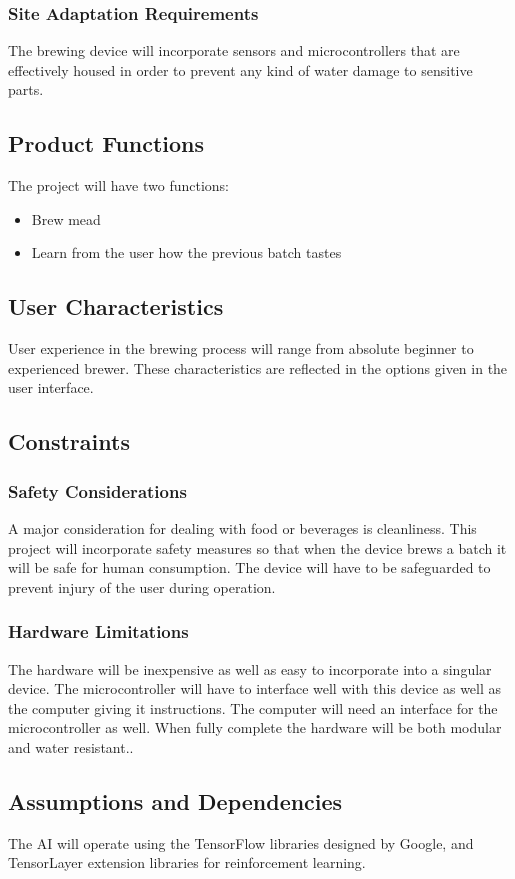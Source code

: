 \documentclass[draftclsnofoot,onecolumn,letterpaper,10pt]{IEEEtran}
\begin{document}
\subsubsection{Site Adaptation Requirements}
The brewing device will incorporate sensors and microcontrollers that are effectively housed
in order to prevent any kind of water damage to sensitive parts.

\subsection{Product Functions}
The project will have two functions:
\begin{itemize}
	\item Brew mead
	\item Learn from the user how the previous batch tastes
\end{itemize}

\subsection{User Characteristics}
User experience in the brewing process will range from absolute beginner to experienced brewer.
These characteristics are reflected in the options given in the user interface.

\subsection{Constraints}
\subsubsection{Safety Considerations}
A major consideration for dealing with food or beverages is cleanliness.
This project will incorporate safety measures so that when the device brews a batch it will be safe for human consumption.
The device will have to be safeguarded to prevent injury of the user during operation.
\subsubsection{Hardware Limitations}
The hardware will be inexpensive as well as easy to incorporate into a singular device.
The microcontroller will have to interface well with this device as well as the computer giving it instructions.
The computer will need an interface for the microcontroller as well.
When fully complete the hardware will be both modular and water resistant..

\subsection{Assumptions and Dependencies}
The AI will operate using the TensorFlow libraries designed by Google, and TensorLayer extension libraries for reinforcement learning.
\end{document}
